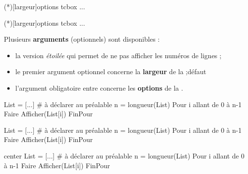 \documentclass[a4paper,french,11pt]{article}
\newcommand\ctex[1]{\tcbox[vignettelatex]{#1}}
\newcommand\cmaj[1]{%
	{\tcbox[vignetteMaJ]{#1}\xspace}%
}
\newcommand\Cle[1]{{\bfseries\sffamily\textlangle #1\textrangle}}
\begin{document}
\begin{codetex}
\begin{PseudoCode}(*)[largeur]{options tcbox}
...
\end{PseudoCode}
\end{codetex}

\begin{codetex}
\begin{PseudoCodeAlt}(*)[largeur]{options tcbox}
...
\end{PseudoCodeAlt}
\end{codetex}

\begin{codecles}
Plusieurs \Cle{arguments} (optionnels) sont disponibles :

\begin{itemize}
	\item la version \textit{étoilée} qui permet de ne pas afficher les numéros de lignes ;
	\item le premier argument optionnel concerne la \Cle{largeur} de la \ctex{tcbox} ;\hfill{}défaut \Cle{12cm}
	\item \cmaj{2.5.8} l'argument obligatoire entre \ctex{\{...\}} concerne les \Cle{options} de la \ctex{tcbox}.
\end{itemize}
\end{codecles}

\begin{codetex}
\begin{PseudoCode}{} %
List = [...]          # à déclarer au préalable
n = longueur(List)
Pour i allant de 0 à n-1 Faire
	Afficher(List[i])
FinPour
\end{PseudoCode}
\end{codetex}

\begin{codesortie}
\begin{PseudoCode}{}
List = [...]          # à déclarer au préalable
n = longueur(List)
Pour i allant de 0 à n-1 Faire
	Afficher(List[i])
FinPour
\end{PseudoCode}
\end{codesortie}

\begin{codetex}
\begin{PseudoCodeAlt}[15cm]{center} %
List = [...]          # à déclarer au préalable
n = longueur(List)
Pour i allant de 0 à n-1 Faire
	Afficher(List[i])
FinPour
\end{PseudoCodeAlt}
\end{codetex}
\end{document}
